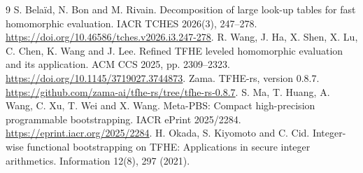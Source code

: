 \documentclass[11pt,a4paper]{article}
\begin{document}
\begin{thebibliography}{9}
 S. Bela\"id, N. Bon and M. Rivain. Decomposition of large look-up tables for fast homomorphic evaluation. IACR TCHES 2026(3), 247--278. \url{https://doi.org/10.46586/tches.v2026.i3.247-278}.
 R. Wang, J. Ha, X. Shen, X. Lu, C. Chen, K. Wang and J. Lee. Refined TFHE leveled homomorphic evaluation and its application. ACM CCS 2025, pp. 2309--2323. \url{https://doi.org/10.1145/3719027.3744873}.
 Zama. TFHE-rs, version 0.8.7. \url{https://github.com/zama-ai/tfhe-rs/tree/tfhe-rs-0.8.7}.
 S. Ma, T. Huang, A. Wang, C. Xu, T. Wei and X. Wang. Meta-PBS: Compact high-precision programmable bootstrapping. IACR ePrint 2025/2284. \url{https://eprint.iacr.org/2025/2284}.
 H. Okada, S. Kiyomoto and C. Cid. Integer-wise functional bootstrapping on TFHE: Applications in secure integer arithmetics. Information 12(8), 297 (2021).\end{thebibliography}
\end{document}
